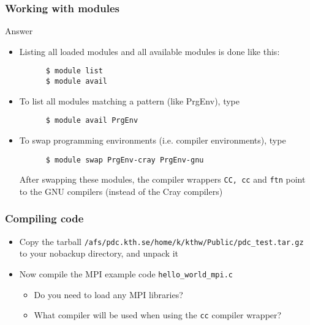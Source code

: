 \begin{frame}[fragile]
  \frametitle{Working with  modules}
\begin{exampleblock}{{Answer}}
    \verbatimfont{\footnotesize}
    \begin{itemize}
    \item Listing all loaded modules and all available modules is done like this:
    \begin{verbatim}
      $ module list
      $ module avail
    \end{verbatim}

    \item To list all modules matching a pattern (like PrgEnv), type
    \begin{verbatim}
      $ module avail PrgEnv
    \end{verbatim}

    \item To swap programming environments (i.e. compiler environments), type
    \begin{verbatim}
      $ module swap PrgEnv-cray PrgEnv-gnu
    \end{verbatim}
    After swapping these modules, the compiler wrappers \verb|CC, cc| and \verb|ftn| point to the GNU compilers (instead of the 
    Cray compilers)

    \end{itemize}

\end{exampleblock}
\end{frame}

\begin{frame}[fragile]
  \frametitle{Compiling code}
\begin{itemize}
  \item Copy the tarball \verb|/afs/pdc.kth.se/home/k/kthw/Public/pdc_test.tar.gz| to  
    your nobackup directory, and unpack it
  \item Now compile the MPI example code \verb|hello_world_mpi.c|
    \begin{itemize}
      \item Do you need to load any MPI libraries?
      \item What compiler will be used when using the \verb|cc| compiler wrapper?
    \end{itemize}
\end{itemize}
\end{frame}


